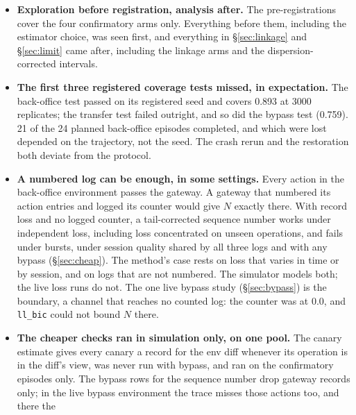 \documentclass[11pt]{article}
\begin{document}
\begin{itemize}
a controlled comparison. Under the registered view 96\% of the hidden mass is bypassed
customer updates that no witness records, so the registered cell asks for extrapolation
to actions with zero capture probability; parsing the scripts is a post hoc change to the
logs. The audit-warning prompt is one pilot of 12 episodes and one fixed prompt, and the
share difference rests on two neutral episodes; it is not an adversarial agent, and an
agent that tried to defeat the audit could do worse. No share threshold is established.
\item \textbf{Exploration before registration, analysis after.} The
pre-registrations cover the four confirmatory arms only. Everything before them,
including the estimator choice, was seen first, and everything in
\S\ref{sec:linkage} and \S\ref{sec:limit} came after, including the linkage
arms and the dispersion-corrected intervals.
\item \textbf{The first three registered coverage tests missed, in expectation.} The
back-office test passed on its registered seed and covers 0.893 at 3000
replicates; the transfer test failed outright, and so did the bypass test (0.759). 21 of the 24 planned back-office
episodes completed, and which were lost depended on the trajectory, not the seed.
The crash rerun and the restoration both deviate from the protocol.
\item \textbf{A numbered log can be enough, in some settings.} Every action in
the back-office environment passes the gateway. A gateway that numbered its action
entries and logged its counter would give $N$ exactly there. With record loss and
no logged counter, a tail-corrected sequence number works under independent loss,
including loss concentrated on unseen operations, and fails under bursts, under
session quality shared by all three logs and with any bypass (\S\ref{sec:cheap}).
The method's case rests on loss that varies in time or by session, and on logs that
are not numbered. The simulator models both; the live loss runs do not. The one live
bypass study (\S\ref{sec:bypass}) is the boundary, a channel that reaches no counted log:
the counter was at 0.0, and \texttt{ll\_bic} could not bound $N$ there.
\item \textbf{The cheaper checks ran in simulation only, on one pool.} The
canary estimate gives every canary a record for the env diff whenever its operation
is in the diff's view, was never run with bypass, and ran on the confirmatory
episodes only. The bypass rows for the sequence number drop gateway records only;
in the live bypass environment the trace misses those actions too, and there the

\end{itemize}
\end{document}
